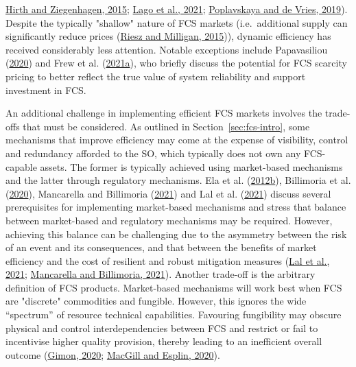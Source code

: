 \documentclass[12pt,a4paper,]{report}
\begin{document}
\protect\hyperlink{ref-hirthBalancingPowerVariable2015}{Hirth and
Ziegenhagen, 2015};
\protect\hyperlink{ref-lagoMarketFrameworkGrid2021}{Lago et al., 2021};
\protect\hyperlink{ref-poplavskayaDistributedEnergyResources2019}{Poplavskaya
and de Vries, 2019}). Despite the typically "shallow" nature of FCS
markets (i.e.~additional supply can significantly reduce prices
(\protect\hyperlink{ref-rieszDesigningElectricityMarkets2015}{Riesz and
Milligan, 2015})), dynamic efficiency has received considerably less
attention. Notable exceptions include Papavasiliou
(\protect\hyperlink{ref-papavasiliouScarcityPricingMissing2020}{2020})
and Frew et al.
(\protect\hyperlink{ref-frewImpactOperatingReserve2021}{2021a}), who
briefly discuss the potential for FCS scarcity pricing to better reflect
the true value of system reliability and support investment in FCS.

An additional challenge in implementing efficient FCS markets involves
the trade-offs that must be considered. As outlined in
Section~\ref{sec:fcs-intro}, some mechanisms that improve efficiency may
come at the expense of visibility, control and redundancy afforded to
the SO, which typically does not own any FCS-capable assets. The former
is typically achieved using market-based mechanisms and the latter
through regulatory mechanisms. Ela et al.
(\protect\hyperlink{ref-elaAlternativeApproachesIncentivizing2012}{2012b}),
Billimoria et al.
(\protect\hyperlink{ref-billimoriaMarketDesignSystem2020}{2020}),
Mancarella and Billimoria
(\protect\hyperlink{ref-mancarellaFragileGridPhysics2021}{2021}) and Lal
et al. (\protect\hyperlink{ref-lalEssentialSystemServices2021}{2021})
discuss several prerequisites for implementing market-based mechanisms
and stress that balance between market-based and regulatory mechanisms
may be required. However, achieving this balance can be challenging due
to the asymmetry between the risk of an event and its consequences, and
that between the benefits of market efficiency and the cost of resilient
and robust mitigation measures
(\protect\hyperlink{ref-lalEssentialSystemServices2021}{Lal et al.,
2021};
\protect\hyperlink{ref-mancarellaFragileGridPhysics2021}{Mancarella and
Billimoria, 2021}). Another trade-off is the arbitrary definition of FCS
products. Market-based mechanisms will work best when FCS are "discrete"
commodities and fungible. However, this ignores the wide ``spectrum'' of
resource technical capabilities. Favouring fungibility may obscure
physical and control interdependencies between FCS and restrict or fail
to incentivise higher quality provision, thereby leading to an
inefficient overall outcome
(\protect\hyperlink{ref-gimonGridPhysicsMarkets2020}{Gimon, 2020};
\protect\hyperlink{ref-macgillEndtoendElectricityMarket2020}{MacGill and
Esplin, 2020}).
\end{document}
